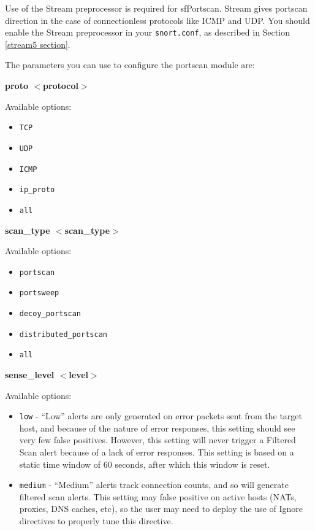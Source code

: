 \documentclass[english]{report}
\newcounter{slistnum}
\newenvironment{slist}
{ \begin{list}{ {\bf \arabic{slistnum}.} }{\usecounter{slistnum} } }
{ \end{list} }
\begin{document}
Use of the Stream preprocessor is required for sfPortscan. Stream gives
portscan direction in the case of connectionless protocols like ICMP and UDP.
You should enable the Stream preprocessor in your \texttt{snort.conf}, as
described in Section \ref{stream5 section}.

The parameters you can use to configure the portscan module are:

\begin{slist}
\item \textbf{proto $<$protocol$>$}

Available options:

\begin{itemize}
\item \texttt{TCP}
\item \texttt{UDP}
\item \texttt{ICMP}
\item \texttt{ip\_proto}
\item \texttt{all}
\end{itemize}

\item \textbf{scan\_type $<$scan\_type$>$}

Available options: 

\begin{itemize}
\item \texttt{portscan} 
\item \texttt{portsweep} 
\item \texttt{decoy\_portscan}
\item \texttt{distributed\_portscan}
\item \texttt{all}
\end{itemize}

\item \textbf{sense\_level $<$level$>$}

Available options:

\begin{itemize}

\item \texttt{low} - ``Low'' alerts are only generated on error packets sent
from the target host, and because of the nature of error responses, this
setting should see very few false positives. However, this setting will never
trigger a Filtered Scan alert because of a lack of error responses. This
setting is based on a static time window of 60 seconds, after which this window
is reset.

\item \texttt{medium} - ``Medium'' alerts track connection counts, and so will
generate filtered scan alerts. This setting may false positive on active hosts
(NATs, proxies, DNS caches, etc), so the user may need to deploy the use of
Ignore directives to properly tune this directive.


\end{itemize}
\end{slist}
\end{document}
